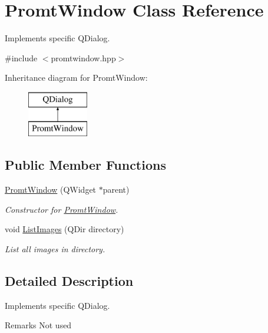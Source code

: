 \hypertarget{classPromtWindow}{}\section{Promt\+Window Class Reference}
\label{classPromtWindow}


Implements specific Q\+Dialog.  




{\ttfamily \#include $<$promtwindow.\+hpp$>$}

Inheritance diagram for Promt\+Window\+:\begin{figure}[H]
\begin{center}
\leavevmode
\includegraphics[height=2.000000cm]{classPromtWindow}
\end{center}
\end{figure}
\subsection*{Public Member Functions}
\begin{DoxyCompactItemize}
\item 
\mbox{\hyperlink{classPromtWindow_a6536787a099e6d7348db00b4382244a8}{Promt\+Window}} (Q\+Widget $\ast$parent)
\begin{DoxyCompactList}\small\item\em Constructor for \mbox{\hyperlink{classPromtWindow}{Promt\+Window}}. \end{DoxyCompactList}\item 
void \mbox{\hyperlink{classPromtWindow_a9f2e84ed19a4f520e0e764c31cc39362}{List\+Images}} (Q\+Dir directory)
\begin{DoxyCompactList}\small\item\em List all images in directory. \end{DoxyCompactList}\end{DoxyCompactItemize}


\subsection{Detailed Description}
Implements specific Q\+Dialog. 

\begin{DoxyRemark}{Remarks}
Not used 
\end{DoxyRemark}


